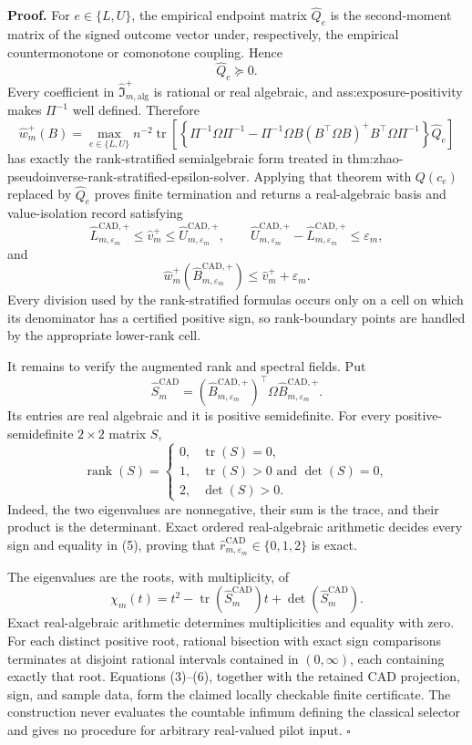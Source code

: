 \textbf{Proof.}
For \(e\in\{L,U\}\), the empirical endpoint matrix \(\widehat Q_e\) is the second-moment matrix of the signed outcome vector under, respectively, the empirical countermonotone or comonotone coupling.  Hence
\[
\widehat Q_e\succeq0.
\tag{1}
\]
Every coefficient in \(\widehat{\mathfrak I}_{m,\mathrm{alg}}^+\) is rational or real algebraic, and ass:exposure-positivity makes \(\Pi^{-1}\) well defined.  Therefore
\[
\widehat w_m^+(B)=
\max_{e\in\{L,U\}}n^{-2}\operatorname{tr}\!\left[
\left\{\Pi^{-1}\Omega\Pi^{-1}
-\Pi^{-1}\Omega B(B^{\top}\Omega B)^+B^{\top}\Omega\Pi^{-1}\right\}
\widehat Q_e\right]
\tag{2}
\]
has exactly the rank-stratified semialgebraic form treated in thm:zhao-pseudoinverse-rank-stratified-epsilon-solver.  Applying that theorem with \(Q(c_e)\) replaced by \(\widehat Q_e\) proves finite termination and returns a real-algebraic basis and value-isolation record satisfying
\[
\widehat L_{m,\varepsilon_m}^{\mathrm{CAD},+}
\le\widehat v_m^+
\le\widehat U_{m,\varepsilon_m}^{\mathrm{CAD},+},
\qquad
\widehat U_{m,\varepsilon_m}^{\mathrm{CAD},+}
-\widehat L_{m,\varepsilon_m}^{\mathrm{CAD},+}
\le\varepsilon_m,
\tag{3}
\]
and
\[
\widehat w_m^+(\widehat B_{m,\varepsilon_m}^{\mathrm{CAD},+})
\le\widehat v_m^++\varepsilon_m.
\tag{4}
\]
Every division used by the rank-stratified formulas occurs only on a cell on which its denominator has a certified positive sign, so rank-boundary points are handled by the appropriate lower-rank cell.

It remains to verify the augmented rank and spectral fields.  Put
\[
\widehat S_m^{\mathrm{CAD}}
=(\widehat B_{m,\varepsilon_m}^{\mathrm{CAD},+})^{\top}
\Omega\widehat B_{m,\varepsilon_m}^{\mathrm{CAD},+}.
\]
Its entries are real algebraic and it is positive semidefinite.  For every positive-semidefinite \(2\times2\) matrix \(S\),
\[
\operatorname{rank}(S)=
\begin{cases}
0,&\operatorname{tr}(S)=0,\\
1,&\operatorname{tr}(S)>0\text{ and }\det(S)=0,\\
2,&\det(S)>0.
\end{cases}
\tag{5}
\]
Indeed, the two eigenvalues are nonnegative, their sum is the trace, and their product is the determinant.  Exact ordered real-algebraic arithmetic decides every sign and equality in (5), proving that \(\widehat r_{m,\varepsilon_m}^{\mathrm{CAD}}\in\{0,1,2\}\) is exact.

The eigenvalues are the roots, with multiplicity, of
\[
\chi_m(t)=t^2-\operatorname{tr}(\widehat S_m^{\mathrm{CAD}})t
+\det(\widehat S_m^{\mathrm{CAD}}).
\tag{6}
\]
Exact real-algebraic arithmetic determines multiplicities and equality with zero.  For each distinct positive root, rational bisection with exact sign comparisons terminates at disjoint rational intervals contained in \((0,\infty)\), each containing exactly that root.  Equations (3)--(6), together with the retained CAD projection, sign, and sample data, form the claimed locally checkable finite certificate.  The construction never evaluates the countable infimum defining the classical selector and gives no procedure for arbitrary real-valued pilot input. \(\square\)